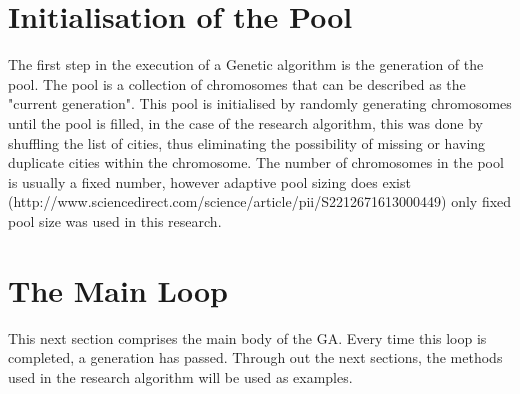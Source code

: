 \section{Initialisation of the Pool}
\par
The first step in the execution of a Genetic algorithm is the generation of the pool. The pool is a collection of chromosomes that can be described as the "current generation". This pool is initialised by randomly generating chromosomes until the pool is filled, in the case of the research algorithm, this was done by shuffling the list of cities, thus eliminating the possibility of missing or having duplicate cities within the chromosome. The number of chromosomes in the pool is usually a fixed number, however adaptive pool sizing does exist (http://www.sciencedirect.com/science/article/pii/S2212671613000449) only fixed pool size was used in this research. 
\section{The Main Loop}
\par
This next section comprises the main body of the GA. Every time this loop is completed, a generation has passed. Through out the next sections, the methods used in the research algorithm will be used as examples.
